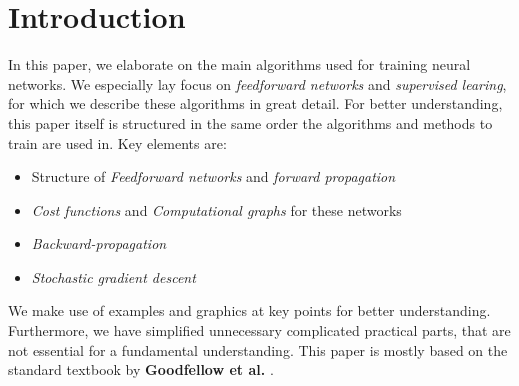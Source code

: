 \section{Introduction}
\label{sec:introduction}

In this paper, we elaborate on the main algorithms used for training neural networks.
We especially lay focus on \emph{feedforward networks} and \emph{supervised learing}, for which we describe these algorithms in great detail.
For better understanding, this paper itself is structured in the same order the algorithms and methods to train are used in.
Key elements are:
\begin{itemize}
    \item Structure of \emph{Feedforward networks} and \emph{forward propagation}
    \item \emph{Cost functions} and \emph{Computational graphs} for these networks
    \item \emph{Backward-propagation}
    \item \emph{Stochastic gradient descent}
\end{itemize}
We make use of examples and graphics at key points for better understanding.
Furthermore, we have simplified unnecessary complicated practical parts, that are not essential for a fundamental understanding.
This paper is mostly based on the standard textbook by \textbf{Goodfellow et al.} \cite{Goodfellow-et-al-2016}.